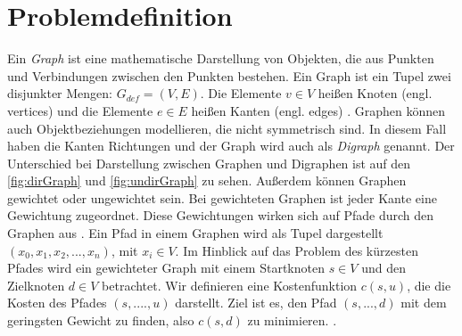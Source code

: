 \section{Problemdefinition}
\label{Kostenfunktion}
Ein \textit{Graph} ist eine mathematische Darstellung von Objekten, die aus Punkten und Verbindungen zwischen den Punkten bestehen. 
Ein Graph ist ein Tupel zwei disjunkter Mengen: $G_{def}= (V,E)$. Die Elemente $v \in V$ heißen Knoten (engl. vertices) und die Elemente $e \in E$ heißen Kanten (engl. edges) \cite[S.15]{Gross.2004}. Graphen können auch Objektbeziehungen modellieren, die nicht symmetrisch sind. In diesem Fall haben die Kanten Richtungen und der Graph wird auch als \textit{Digraph} genannt. Der Unterschied bei Darstellung zwischen Graphen und Digraphen ist auf den \ref{fig:dirGraph} und \ref{fig:undirGraph} zu sehen. Außerdem können Graphen gewichtet oder ungewichtet sein. Bei gewichteten Graphen ist jeder Kante eine Gewichtung zugeordnet. 
Diese Gewichtungen wirken sich auf Pfade durch den Graphen aus \cite[S.18]{Gross.2004}. 
Ein Pfad in einem Graphen wird als Tupel dargestellt $\left ( x_{0}, x_{1}, x_{2}, ..., x_{n} \right )$, mit $x_{i} \in V$. 
Im Hinblick auf das Problem des kürzesten Pfades wird ein gewichteter Graph mit einem Startknoten $s \in V$ und den Zielknoten $d \in V$ betrachtet. Wir definieren eine Kostenfunktion $c(s,u)$, die die Kosten des Pfades $ (s, ...., u)$ darstellt. Ziel ist es, den Pfad  $\left ( s, ..., d \right )$ mit dem geringsten Gewicht zu finden, also $c(s,d)$ zu minimieren. \cite[S.4]{Madkour.2017}.


